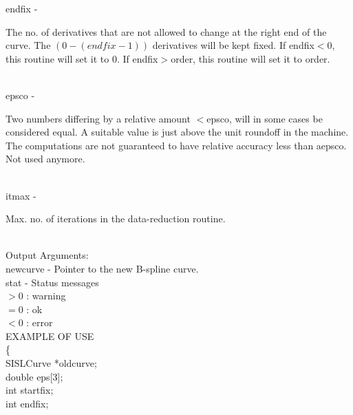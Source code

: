         \>\>    {\fov endfix}   \> - \> \begin{minipg2}
                        The no. of derivatives that are not allowed to
                        change at the right end of the curve. The
                        $(0 - (endfix-1))$ derivatives will be kept fixed.
                        If endfix$<$0, this routine will set it to 0.
                        If endfix$>$order, this routine will set it to order.
                                \end{minipg2}\\[0.8ex]
        \>\>    {\fov epsco}    \> - \> \begin{minipg2}
                        Two numbers differing by a relative amount
                        $<$epsco, will in some cases be considered equal. A
                        suitable value is just above the unit roundoff in the
                        machine.  The computations are not guaranteed to
                        have relative accuracy less than aepsco.
                        Not used anymore.
                                \end{minipg2}\\[0.3ex]
        \>\>    {\fov itmax}    \> - \> \begin{minipg2}
                                Max. no. of iterations in the data-reduction routine.
                                \end{minipg2}\\[0.8ex]
        \>Output Arguments:\\
        \>\>    {\fov newcurve}\> - \> Pointer to the new B-spline curve.\\
        \>\>    {\fov stat}     \> - \> Status messages\\
                \>\>\>\>\>              $> 0$   : warning\\
                \>\>\>\>\>              $= 0$   : ok\\
                \>\>\>\>\>              $< 0$   : error\\
\newpagetabs
EXAMPLE OF USE\\
                \>      \{ \\
                \>\>    SISLCurve       \>      *{\fov oldcurve};\\
                \>\>    double  \>      {\fov eps}[3];\\
                \>\>    int     \>      {\fov startfix};\\
                \>\>    int     \>      {\fov endfix};\\
